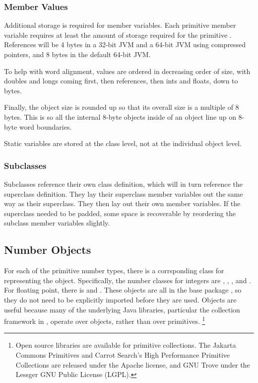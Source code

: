 \subsubsection{Member Values}

Additional storage is required for member variables.  Each primitive
member variable requires at least the amount of storage required for
the primitive .  References will be 4 bytes in
a 32-bit JVM and a 64-bit JVM using compressed pointers, and 8 bytes
in the default 64-bit JVM.

To help with word alignment, values are ordered in decreasing order of
size, with doubles and longs coming first, then references, then ints
and floats, down to bytes.

Finally, the object size is rounded up so that its overall size
is a multiple of 8 bytes.  This is so all the internal 8-byte
objects inside of an object line up on 8-byte word boundaries.

Static variables are stored at the class level, not at the individual
object level.

\subsubsection{Subclasses}

Subclasses reference their own class definition, which will in turn
reference the superclass definition.  They lay their superclass member
variables out the same way as their superclass.  They then lay out
their own member variables.  If the superclass needed to be padded, some
space is recoverable by reordering the subclass member variables
slightly.

\subsection{Number Objects}

For each of the primitive number types, there is a corrsponding class
for representing the object.  Specifically, the number classes for
integers are , , , and
.  For floating point, there is  and
.  These objects are all in the base package
, so they do not need to be explicitly imported before
they are used.  Objects are useful because many of the underlying Java
libraries, particular the collection framework in ,
operate over objects, rather than over primitives.%
%
\footnote{Open source libraries are available for primitive collections.
The Jakarta Commons Primitives and Carrot Search's
High Performance Primitive Collections are released under the Apache license,
and GNU Trove under the Lessger GNU Public License (LGPL).}

